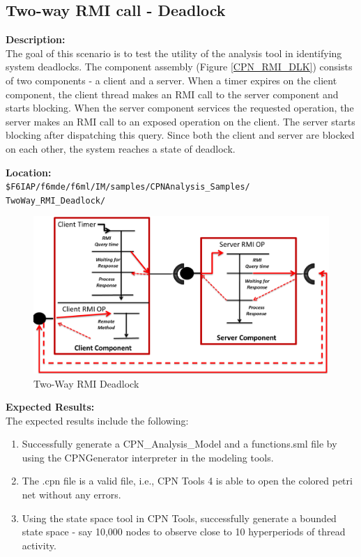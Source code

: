 \subsection{Two-way RMI call - Deadlock}
\label{sec:Two_Way_RMI}

\noindent\textbf{Description:}\\
The goal of this scenario is to test the utility of the analysis tool in identifying system deadlocks. The component assembly (Figure \ref{CPN_RMI_DLK}) consists of two components - a client and a server. When a timer expires on the client component, the client thread makes an RMI call to the server component and starts blocking. When the server component services the requested operation, the server makes an RMI call to an exposed operation on the client. The server starts blocking after dispatching this query. Since both the client and server are blocked on each other, the system reaches a state of deadlock.

\noindent\textbf{Location:}\\
\texttt{\$F6IAP/f6mde/f6ml/IM/samples/CPNAnalysis\_Samples/ \\ TwoWay\_RMI\_Deadlock/}

\begin{figure}[htb]
\centering
\includegraphics[scale=0.30]{./figs/CPN_RMI_DLK.png}
\caption{Two-Way RMI Deadlock}
\label{fig:CPN_RMI_DLK}
\end{figure}

\noindent\textbf{Expected Results:}\\

The expected results include the following: 
\begin{enumerate}
\item Successfully generate a CPN\_Analysis\_Model and a functions.sml file by using the CPNGenerator interpreter in the modeling tools.
\item The .cpn file is a valid file, i.e., CPN Tools 4 is able to open the colored petri net without any errors.
\item Using the state space tool in CPN Tools, successfully generate a bounded state space - say 10,000 nodes to observe close to 10 hyperperiods of thread activity.
\end{enumerate}

